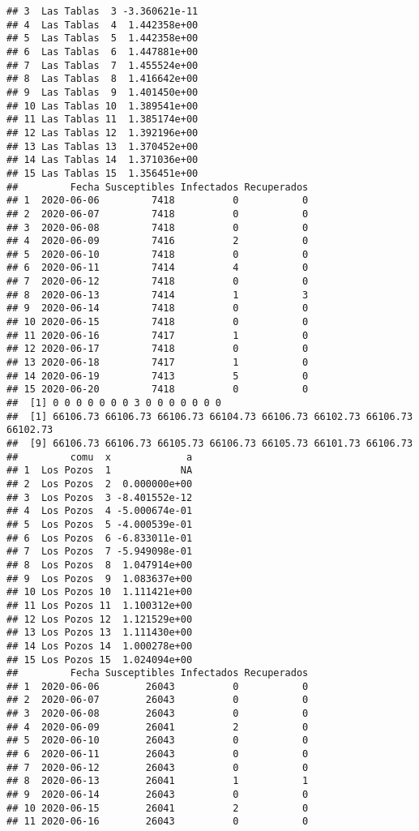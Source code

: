 \documentclass[
]{article}
\begin{document}
\begin{verbatim}
## 3  Las Tablas  3 -3.360621e-11
## 4  Las Tablas  4  1.442358e+00
## 5  Las Tablas  5  1.442358e+00
## 6  Las Tablas  6  1.447881e+00
## 7  Las Tablas  7  1.455524e+00
## 8  Las Tablas  8  1.416642e+00
## 9  Las Tablas  9  1.401450e+00
## 10 Las Tablas 10  1.389541e+00
## 11 Las Tablas 11  1.385174e+00
## 12 Las Tablas 12  1.392196e+00
## 13 Las Tablas 13  1.370452e+00
## 14 Las Tablas 14  1.371036e+00
## 15 Las Tablas 15  1.356451e+00
##         Fecha Susceptibles Infectados Recuperados
## 1  2020-06-06         7418          0           0
## 2  2020-06-07         7418          0           0
## 3  2020-06-08         7418          0           0
## 4  2020-06-09         7416          2           0
## 5  2020-06-10         7418          0           0
## 6  2020-06-11         7414          4           0
## 7  2020-06-12         7418          0           0
## 8  2020-06-13         7414          1           3
## 9  2020-06-14         7418          0           0
## 10 2020-06-15         7418          0           0
## 11 2020-06-16         7417          1           0
## 12 2020-06-17         7418          0           0
## 13 2020-06-18         7417          1           0
## 14 2020-06-19         7413          5           0
## 15 2020-06-20         7418          0           0
##  [1] 0 0 0 0 0 0 0 3 0 0 0 0 0 0 0
##  [1] 66106.73 66106.73 66106.73 66104.73 66106.73 66102.73 66106.73 66102.73
##  [9] 66106.73 66106.73 66105.73 66106.73 66105.73 66101.73 66106.73
##         comu  x             a
## 1  Los Pozos  1            NA
## 2  Los Pozos  2  0.000000e+00
## 3  Los Pozos  3 -8.401552e-12
## 4  Los Pozos  4 -5.000674e-01
## 5  Los Pozos  5 -4.000539e-01
## 6  Los Pozos  6 -6.833011e-01
## 7  Los Pozos  7 -5.949098e-01
## 8  Los Pozos  8  1.047914e+00
## 9  Los Pozos  9  1.083637e+00
## 10 Los Pozos 10  1.111421e+00
## 11 Los Pozos 11  1.100312e+00
## 12 Los Pozos 12  1.121529e+00
## 13 Los Pozos 13  1.111430e+00
## 14 Los Pozos 14  1.000278e+00
## 15 Los Pozos 15  1.024094e+00
##         Fecha Susceptibles Infectados Recuperados
## 1  2020-06-06        26043          0           0
## 2  2020-06-07        26043          0           0
## 3  2020-06-08        26043          0           0
## 4  2020-06-09        26041          2           0
## 5  2020-06-10        26043          0           0
## 6  2020-06-11        26043          0           0
## 7  2020-06-12        26043          0           0
## 8  2020-06-13        26041          1           1
## 9  2020-06-14        26043          0           0
## 10 2020-06-15        26041          2           0
## 11 2020-06-16        26043          0           0

\end{verbatim}
\end{document}
